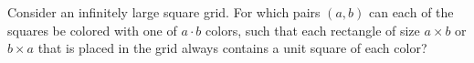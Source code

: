 Consider an infinitely large square grid. For which pairs $(a,b)$ can each of the squares
be colored with one of $a\cdot b$ colors, such that each rectangle of size $a \times b$ or
$b \times a$ that is placed in the grid always contains a unit square of each color?